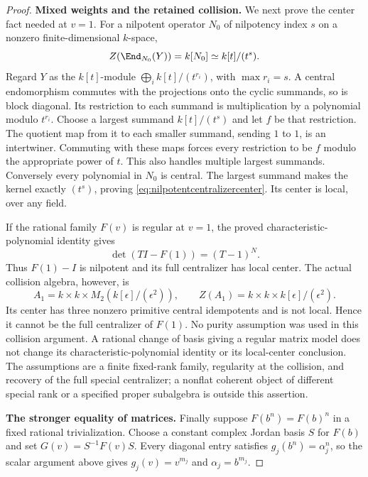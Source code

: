 \begin{proof}
\par\smallskip\noindent\textbf{Mixed weights and the retained collision.}\quad
We next prove the center fact needed at $v=1$.
For a nilpotent operator $N_0$ of nilpotency index $s$
on a nonzero finite-dimensional $k$-space,
\begin{equation}\label{eq:nilpotentcentralizercenter}
 Z(\End_{N_0}(Y))=k[N_0]\simeq k[t]/(t^s).
\end{equation}
Regard $Y$ as the $k[t]$-module
$\bigoplus_i k[t]/(t^{r_i})$, with $\max r_i=s$.
A central endomorphism commutes with the projections
onto the cyclic summands, so is block diagonal.
Its restriction to each summand is multiplication by
a polynomial modulo $t^{r_i}$.
Choose a largest summand $k[t]/(t^s)$ and let $f$
be that restriction. The quotient map from it to each
smaller summand, sending $1$ to $1$, is an intertwiner.
Commuting with these maps forces every restriction to
be $f$ modulo the appropriate power of $t$.
This also handles multiple largest summands.
Conversely every polynomial in $N_0$ is central.
The largest summand makes the kernel exactly $(t^s)$,
proving \eqref{eq:nilpotentcentralizercenter}.
Its center is local, over any field.

If the rational family $F(v)$ is regular at $v=1$,
the proved characteristic-polynomial identity gives
\[
 \det(TI-F(1))=(T-1)^N.
\]
Thus $F(1)-I$ is nilpotent and its full centralizer has
local center. The actual collision algebra, however, is
\[
 A_1=k\times k\times M_2(k[\epsilon]/(\epsilon^2)),
\qquad
 Z(A_1)=k\times k\times k[\epsilon]/(\epsilon^2).
\]
Its center has three nonzero primitive central idempotents
and is not local. Hence it cannot be the full centralizer
of $F(1)$.
No purity assumption was used in this collision argument.
A rational change of basis giving a regular matrix model
does not change its characteristic-polynomial identity
or its local-center conclusion.
The assumptions are a finite fixed-rank family, regularity
at the collision, and recovery of the full special
centralizer; a nonflat coherent object of different
special rank or a specified proper subalgebra is outside
this assertion.

\par\smallskip\noindent\textbf{The stronger equality of matrices.}\quad
Finally suppose $F(b^n)=F(b)^n$ in a fixed rational
trivialization. Choose a constant complex Jordan basis
$S$ for $F(b)$ and set $G(v)=S^{-1}F(v)S$.
Every diagonal entry satisfies
$g_j(b^n)=\alpha_j^n$, so the scalar argument above gives
$g_j(v)=v^{m_j}$ and $\alpha_j=b^{m_j}$.


\end{proof}
